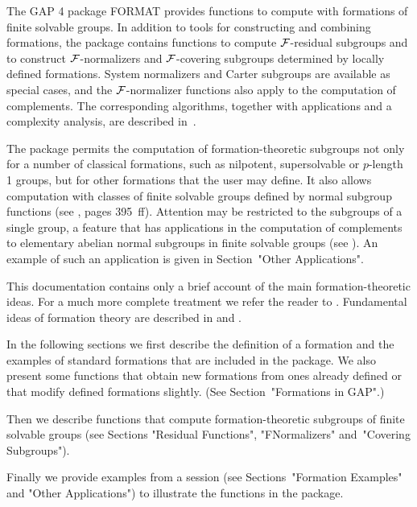 
\def\FORMAT{{\sf FORMAT}}
\def\F{{\cal{F}}}


The GAP 4 package {\FORMAT} provides functions to compute with formations 
of finite solvable groups.  In addition to tools for constructing and 
combining formations, the package contains functions to compute 
$\F$-residual subgroups and to construct $\F$-normalizers and 
$\F$-covering subgroups determined by locally defined formations. 
System normalizers and Carter subgroups are available as special cases, 
and the $\F$-normalizer functions also apply to the computation of 
complements. The corresponding algorithms, together with applications 
and a complexity analysis, are described in~\cite{EW}. 

The package permits the computation of formation-theoretic subgroups 
not only for a number of classical formations, such as nilpotent,
supersolvable or $p$-length 1 groups, but for other formations that the
user may define. It also allows computation with classes of
finite solvable groups defined by normal subgroup functions (see
\cite{DH}, pages 395~ff). Attention may be restricted to the
subgroups of a single group, a feature that has applications
in the computation of complements to elementary abelian normal subgroups
in finite solvable groups (see \cite{EW}). An example of such an 
application is given in Section~"Other Applications".

This documentation contains only a brief account of the main 
formation-theoretic ideas. For a much more complete treatment we
refer the reader to \cite{DH}. Fundamental ideas of formation theory are
described in \cite{G} and \cite{CH}.

In the following sections we first describe the {\GAP} definition of a
formation and the examples of standard formations that are included in 
the package. We also present some functions that obtain new formations 
from ones already defined or that modify defined formations slightly.
(See Section~"Formations in GAP".) 

Then we describe functions that compute formation-theoretic subgroups 
of finite solvable groups (see Sections "Residual Functions", 
"FNormalizers" and~"Covering Subgroups"). 

Finally we provide examples from a {\GAP} session (see Sections~"Formation
Examples" and "Other Applications") to illustrate the functions in the package.

